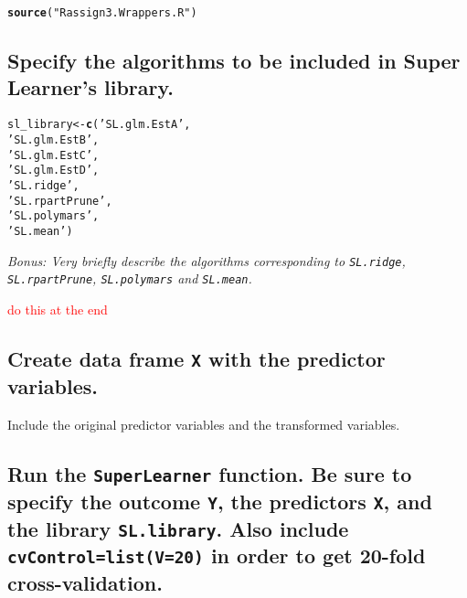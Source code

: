 \documentclass{article}\usepackage[]{graphicx}\usepackage[]{xcolor}
\makeatletter
\newcommand{\hlstr}[1]{\textcolor[rgb]{0.192,0.494,0.8}{#1}}%
\newcommand{\hlstd}[1]{\textcolor[rgb]{0.345,0.345,0.345}{#1}}%
\newcommand{\hlkwb}[1]{\textcolor[rgb]{0.69,0.353,0.396}{#1}}%
\newcommand{\hlkwd}[1]{\textcolor[rgb]{0.737,0.353,0.396}{\textbf{#1}}}%
\newenvironment{kframe}{%
 \def\at@end@of@kframe{}%
 \ifinner\ifhmode%
  \def\at@end@of@kframe{\end{minipage}}%
  \begin{minipage}{\columnwidth}%
 \fi\fi%
 \def\FrameCommand##1{\hskip\@totalleftmargin \hskip-\fboxsep
 \colorbox{shadecolor}{##1}\hskip-\fboxsep
     \hskip-\linewidth \hskip-\@totalleftmargin \hskip\columnwidth}%
 \MakeFramed {\advance\hsize-\width
   \@totalleftmargin\z@ \linewidth\hsize
   \@setminipage}}%
 {\par\unskip\endMakeFramed%
 \at@end@of@kframe}
\newenvironment{knitrout}{}{} %
\makeatother
\begin{document}
\begin{knitrout}
\color{fgcolor}\begin{kframe}
\begin{alltt}
\hlkwd{source}\hlstd{(}\hlstr{"Rassign3.Wrappers.R"}\hlstd{)}
\end{alltt}
\end{kframe}
\end{knitrout}

  \subsection{Specify the algorithms to be included in Super Learner's library.}
  
\begin{knitrout}
\color{fgcolor}\begin{kframe}
\begin{alltt}
\hlstd{sl_library} \hlkwb{<-} \hlkwd{c}\hlstd{(}\hlstr{'SL.glm.EstA'}\hlstd{,}
                \hlstr{'SL.glm.EstB'}\hlstd{,}
                \hlstr{'SL.glm.EstC'}\hlstd{,}
                \hlstr{'SL.glm.EstD'}\hlstd{,}
                \hlstr{'SL.ridge'}\hlstd{,}
                \hlstr{'SL.rpartPrune'}\hlstd{,}
                \hlstr{'SL.polymars'}\hlstd{,}
                \hlstr{'SL.mean'}\hlstd{)}
\end{alltt}
\end{kframe}
\end{knitrout}
  
  
  
  \textit{Bonus: Very briefly describe the algorithms corresponding to \texttt{SL.ridge}, \texttt{SL.rpartPrune}, \texttt{SL.polymars} and \texttt{SL.mean}.}
  
  \textcolor{red}{do this at the end}
  
  \subsection{Create data frame \texttt{X} with the predictor variables.} Include the original predictor variables and the transformed variables.
  
  \subsection{Run the \texttt{SuperLearner} function. Be sure to specify the outcome \texttt{Y}, the predictors \texttt{X}, and the library \texttt{SL.library}. Also include \texttt{cvControl=list(V=20)} in order to get 20-fold cross-validation.}
  
\end{document}
